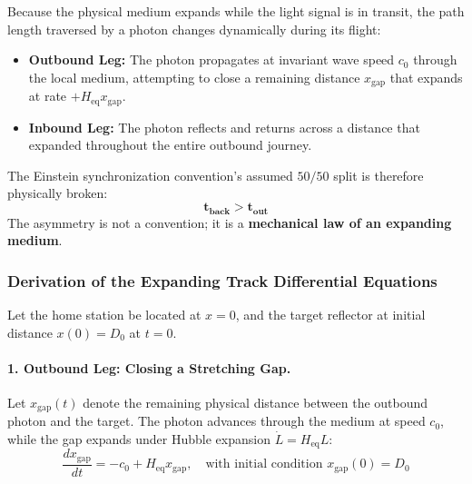 \documentclass[11pt,a4paper]{article}
\begin{document}
Because the physical medium expands while the light signal is in transit, the path length traversed by a photon changes dynamically during its flight:
\begin{itemize}
    \item \textbf{Outbound Leg:} The photon propagates at invariant wave speed $c_0$ through the local medium, attempting to close a remaining distance $x_{\text{gap}}$ that expands at rate $+H_{\text{eq}} x_{\text{gap}}$.
    \item \textbf{Inbound Leg:} The photon reflects and returns across a distance that expanded throughout the entire outbound journey.
\end{itemize}

The Einstein synchronization convention's assumed $50/50$ split is therefore physically broken:
\begin{equation}
\mathbf{t_{\text{back}} > t_{\text{out}}}
\end{equation}
The asymmetry is not a convention; it is a \textbf{mechanical law of an expanding medium}.

\subsubsection{Derivation of the Expanding Track Differential Equations}

Let the home station be located at $x = 0$, and the target reflector at initial distance $x(0) = D_0$ at $t = 0$.

\paragraph{1. Outbound Leg: Closing a Stretching Gap.}
Let $x_{\text{gap}}(t)$ denote the remaining physical distance between the outbound photon and the target. The photon advances through the medium at speed $c_0$, while the gap expands under Hubble expansion $\dot{L} = H_{\text{eq}} L$:
\begin{equation}
\frac{d x_{\text{gap}}}{dt} = -c_0 + H_{\text{eq}} x_{\text{gap}}, \quad \text{with initial condition } x_{\text{gap}}(0) = D_0
\label{eq:ode_outbound}
\end{equation}
\end{document}
